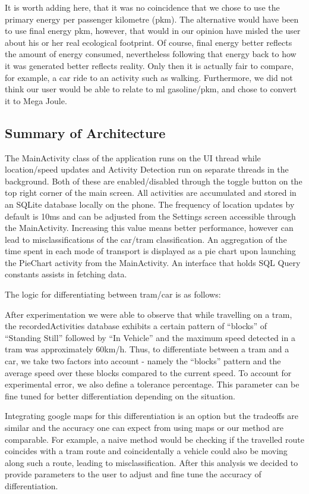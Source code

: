 \documentclass[10pt,conference,compsocconf]{IEEEtran}
\begin{document}
It is worth adding here, that it was no coincidence that we chose to use the primary energy per passenger kilometre (pkm). The alternative would have been to use final energy pkm, however, that would in our opinion have misled the user about his or her real ecological footprint. Of course, final energy better reflects the amount of energy consumed, nevertheless following that energy back to how it was generated better reflects reality. Only then it is actually fair to compare, for example, a car ride to an activity such as walking. 
Furthermore, we did not think our user would be able to relate to ml gasoline/pkm, and chose to convert it to Mega Joule. 


\subsection{Summary of Architecture}

The MainActivity class of the application runs on the UI thread while location/speed updates and Activity Detection run on separate threads in the background. Both of these are enabled/disabled through the toggle button on the top right corner of the main screen. All activities are accumulated and stored in an SQLite database locally on the phone. The frequency of location updates by default is 10ms and can be adjusted from the Settings screen accessible through the MainActivity. Increasing this value means better performance, however can lead to misclassifications of the car/tram classification. An aggregation of the time spent in each mode of transport is displayed as a pie chart upon launching the PieChart activity from the MainActivity. An interface that holds SQL Query constants assists in fetching data.

The logic for differentiating between tram/car is as follows:

After experimentation we were able to observe that while travelling on a tram, the recordedActivities database exhibits a certain pattern of “blocks” of “Standing Still” followed by “In Vehicle” and the maximum speed detected in a tram was approximately 60km/h. Thus, to differentiate between a tram and a car, we take two factors into account - namely the “blocks” pattern and the average speed over these blocks compared to the current speed. To account for experimental error, we also define a tolerance percentage. This parameter can be fine tuned for better differentiation depending on the situation.

Integrating google maps for this differentiation is an option but the tradeoffs are similar and the accuracy one can expect from using maps or our method are comparable. For example, a naive method would be checking if the travelled route coincides with a tram route and coincidentally a vehicle could also be moving along such a route, leading to misclassification. After this analysis we decided to provide parameters to the user to adjust and fine tune the accuracy of differentiation.
\end{document}
